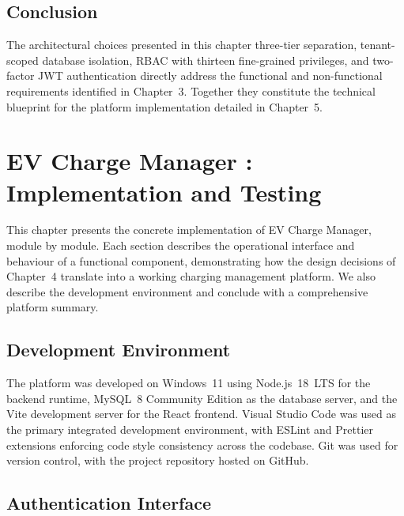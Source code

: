 \documentclass[12pt,a4paper]{report}
\begin{document}
\FloatBarrier
\section{Conclusion}

The architectural choices presented in this chapter  three-tier separation, tenant-scoped
database isolation, RBAC with thirteen fine-grained privileges, and two-factor JWT
authentication  directly address the functional and non-functional requirements identified in
Chapter~3. Together they constitute the technical blueprint for the platform implementation
detailed in Chapter~5.


\chapter{EV Charge Manager : Implementation and Testing}

This chapter presents the concrete implementation of EV Charge Manager, module by module. Each
section describes the operational interface and behaviour of a functional component, demonstrating
how the design decisions of Chapter~4 translate into a working charging management platform. We
also describe the development environment and conclude with a comprehensive platform summary.

\section{Development Environment}

The platform was developed on Windows~11 using Node.js~18~LTS for the backend runtime,
MySQL~8 Community Edition as the database server, and the Vite development server for the
React frontend. Visual Studio Code was used as the primary integrated development environment,
with ESLint and Prettier extensions enforcing code style consistency across the codebase. Git
was used for version control, with the project repository hosted on GitHub.

\section{Authentication Interface}
\end{document}
